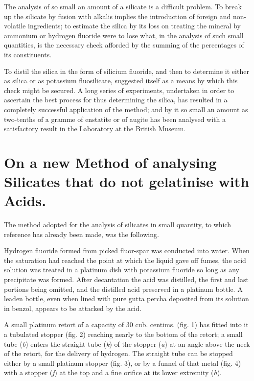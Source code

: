 \documentclass[a4paper, 12pt, oneside]{article}
\begin{document}
The analysis of so small an amount of a silicate is a difficult problem. To break up the silicate by fusion with alkalis implies the introduction of foreign and non-volatile ingredients; to estimate the silica by its loss on treating the mineral by ammonium or hydrogen fluoride were to lose what, in the analysis of such small quantities, is the necessary check afforded by the summing of the percentages of its constituents.

To distil the silica in the form of silicium fluoride, and then to determine it either as silica or as potassium fluosilicate, suggested itself as a means by which this check might be secured. A long series of experiments, undertaken in order to ascertain the best process for thus determining the silica, has resulted in a completely successful application of the method; and by it so small an amount as two-tenths of a gramme of enstatite or of augite has been analysed with a satisfactory result in the Laboratory at the British Museum.
\clearpage
\section{On a new Method of analysing Silicates that do not gelatinise with Acids.}
\paragraph{}
The method adopted for the analysis of silicates in small quantity, to which reference has already been made, was the following.

Hydrogen fluoride formed from picked fluor-spar was conducted into water. When the saturation had reached the point at which the liquid gave off fumes, the acid solution was treated in a platinum dish with potassium fluoride so long as any precipitate was formed. After decantation the acid was distilled, the first and last portions being omitted, and the distilled acid preserved in a platinum bottle. A leaden bottle, even when lined with pure gutta percha deposited from its solution in benzol, appears to be attacked by the acid.

A small platinum retort of a capacity of 30 cub. centims. (fig. 1) has fitted into it a tubulated stopper (fig. 2) reaching nearly to the bottom of the retort; a small tube (\emph{b}) enters the straight tube (\emph{k}) of the stopper (\emph{a}) at an angle above the neck of the retort, for the delivery of hydrogen. The straight tube can be stopped either by a small platinum stopper (fig. 3), or by a funnel of that metal (fig. 4) with a stopper (\emph{f}) at the top and a fine orifice at its lower extremity (\emph{h}).
\end{document}
